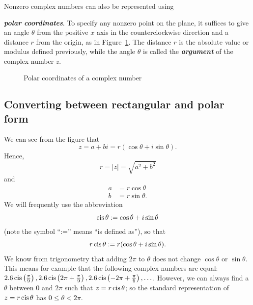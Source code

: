 Nonzero complex numbers can also be represented using {\textbf{\emph{ polar
coordinates}}. To specify any nonzero point on the plane, it suffices
to give an angle $\theta$ from the positive $x$ axis in the counterclockwise
direction and a distance $r$ from the origin, as in Figure~\ref{polarcoord}.
The distance  $r$ is the absolute value or modulus defined previously, while the angle $\theta$ is called the {\bf \emph{argument}} of the complex number $z$.
\begin{figure}[htb]
\begin{center}

\end{center}
\caption{Polar coordinates of a complex number}
\label{polarcoord}
\end{figure}


\subsection{Converting between rectangular and polar form}

We can see from the figure that \[
z=a+bi=r(\cos\theta+i\sin\theta).\]
 Hence, \[
r=|z|=\sqrt{a^{2}+b^{2}}\]
 and \begin{align*}
a & =r\cos\theta\\
b & =r\sin\theta.\end{align*}
 We will frequently use the abbreviation
\[ \operatorname{cis}\theta := \cos\theta+i\sin\theta \]
(note the symbol ``:='' means ``is defined as''), so that
\[ r\operatorname{cis}\theta := r(\cos\theta+i\sin\theta).\]
We know from trigonometry that adding $2 \pi$ to $\theta$ does not change $\cos \theta$ or $\sin \theta$. This means for example that the following complex numbers are equal: $2.6 \operatorname{cis}\left(\frac{\pi}{9}\right), 2.6 \operatorname{cis}\left(2\pi + \frac{\pi}{9}\right), 2.6 \operatorname{cis}\left(-2\pi + \frac{\pi}{9}\right), \ldots $.  However, we can always find a $\theta$ between $0$ and $2\pi$ such that $z = r \operatorname{cis} \theta$;  so the standard representation of $z = r \operatorname{cis} \theta$ has $0 \leq \theta < 2\pi$.

}
